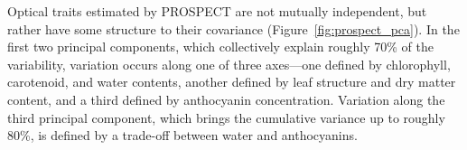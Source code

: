Optical traits estimated by PROSPECT are not mutually independent, but rather have some structure to their covariance (Figure~\ref{fig:prospect_pca}).
In the first two principal components, which collectively explain roughly 70\% of the variability, variation occurs along one of three axes---one defined by chlorophyll, carotenoid, and water contents, another defined by leaf structure and dry matter content, and a third defined by anthocyanin concentration.
% 
% 
% 
% 
% 
Variation along the third principal component, which brings the cumulative variance up to roughly 80\%, is defined by a trade-off between water and anthocyanins.

